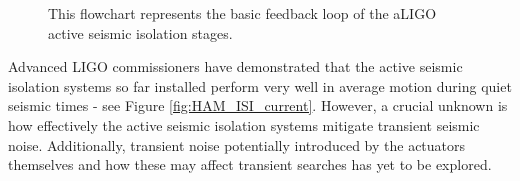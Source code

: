 \begin{figure}[htb]
	\caption{\label{fig:SEI_iso} This flowchart represents the basic feedback loop of the aLIGO active seismic isolation stages.}
\end{figure}

Advanced LIGO commissioners have demonstrated that the active seismic isolation systems so far installed perform very well in average motion during quiet seismic times - see Figure \ref{fig:HAM_ISI_current}.
However, a crucial unknown is how effectively the active seismic isolation systems mitigate transient seismic noise. Additionally, transient noise potentially introduced by the actuators themselves and how these may affect transient \gw{} searches has yet to be explored. 

